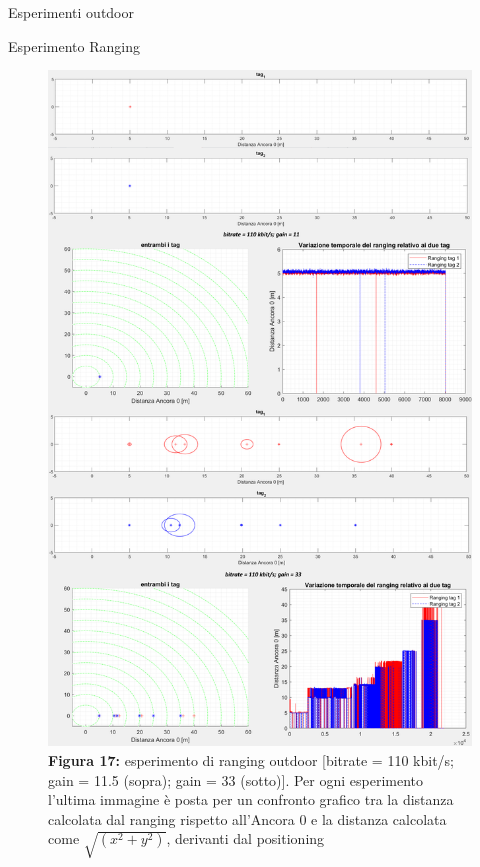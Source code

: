 \documentclass[12pt]{report}
\begin{document}
\begin{section}{Esperimenti outdoor}
\begin{subsection}{Esperimento Ranging}
			\begin{figure}[H]
				\centering
				\includegraphics[scale=0.17]{EspOut110}
	 			\caption{\textbf{Figura 17:} esperimento di ranging outdoor [bitrate = 110 kbit/s; gain = 11.5 (sopra); gain = 33 (sotto)]. Per ogni  esperimento l'ultima immagine è posta per un confronto grafico tra la distanza calcolata dal ranging rispetto all'Ancora 0 e la distanza calcolata come $\sqrt{(x^2+y^2)}$, 						derivanti dal positioning\label{EspOut110}}
			\end{figure}
			

\end{subsection}
\end{section}
\end{document}
